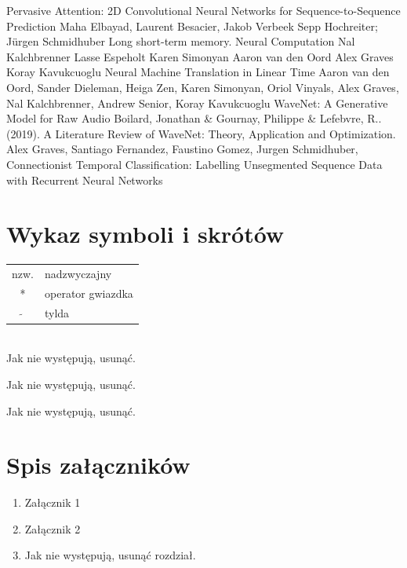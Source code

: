 \documentclass[a4paper,11pt,twoside]{report}
\theoremstyle{definition}
\begin{document}
\begin{thebibliography}{20}
Pervasive Attention: 2D Convolutional Neural Networks for Sequence-to-Sequence Prediction Maha Elbayad, Laurent Besacier, Jakob Verbeek
 Sepp Hochreiter; Jürgen Schmidhuber Long short-term memory. Neural Computation
 Nal Kalchbrenner  Lasse Espeholt  Karen Simonyan  Aaron van den Oord  Alex Graves  Koray Kavukcuoglu Neural Machine Translation in Linear Time
Aaron van den Oord, Sander Dieleman, Heiga Zen, Karen Simonyan, Oriol Vinyals, Alex Graves, Nal Kalchbrenner, Andrew Senior, Koray Kavukcuoglu WaveNet: A Generative Model for Raw Audio
 Boilard, Jonathan \& Gournay, Philippe \& Lefebvre, R.. (2019). A Literature Review of WaveNet: Theory, Application and Optimization. 
Alex Graves, Santiago Fernandez, Faustino Gomez, Jurgen Schmidhuber, Connectionist Temporal Classification: Labelling Unsegmented Sequence Data with Recurrent Neural Networks
\end{thebibliography}

\thispagestyle{empty}



\chapter*{Wykaz symboli i skrótów}

\begin{tabular}{cl}
nzw. & nadzwyczajny \\
* & operator gwiazdka \\
$\widetilde{}$ & tylda
\end{tabular}
\\
Jak nie występują, usunąć.
\thispagestyle{empty}


\listoffigures
\thispagestyle{empty}
Jak nie występują, usunąć.


\renewcommand{\listtablename}{Spis tabel}
\listoftables
\thispagestyle{empty}
Jak nie występują, usunąć.



\chapter*{Spis załączników}
\begin{enumerate}
\item Załącznik 1
\item Załącznik 2
\item Jak nie występują, usunąć rozdział.
\end{enumerate}
\thispagestyle{empty}
\end{document}
